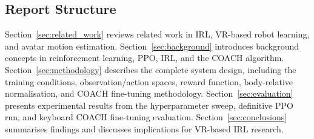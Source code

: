 \documentclass[../report.tex]{subfiles}
\begin{document}
    \subsection{Report Structure}
    \label{sec:introduction:structure}

    Section~\ref{sec:related_work} reviews related work in IRL, VR-based robot learning, and avatar motion estimation. Section~\ref{sec:background} introduces background concepts in reinforcement learning, PPO, IRL, and the COACH algorithm. Section~\ref{sec:methodology} describes the complete system design, including the training conditions, observation/action spaces, reward function, body-relative normalisation, and COACH fine-tuning methodology. Section~\ref{sec:evaluation} presents experimental results from the hyperparameter sweep, definitive PPO run, and keyboard COACH fine-tuning evaluation. Section~\ref{sec:conclusions} summarises findings and discusses implications for VR-based IRL research.
\end{document}
